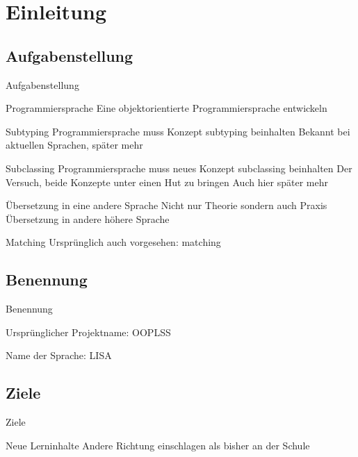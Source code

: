 \section{Einleitung}
\subsection{Aufgabenstellung}
\begin{frame}[t]{Aufgabenstellung}
	\begin{bigitemize}[<+->]{3mm}
		\item Programmiersprache
		 {Eine objektorientierte Programmiersprache entwickeln}

		\item Subtyping
		 {Programmiersprache muss Konzept subtyping beinhalten}
		 {Bekannt bei aktuellen Sprachen, später mehr}

		\item Subclassing
		 {Programmiersprache muss neues Konzept subclassing beinhalten}
		 {Der Versuch, beide Konzepte unter einen Hut zu bringen}
		 {Auch hier später mehr}

		\item Übersetzung in eine andere Sprache
		 {Nicht nur Theorie sondern auch Praxis}
		 {Übersetzung in andere höhere Sprache}

		\item Matching
		 {Ursprünglich auch vorgesehen: matching}

	\end{bigitemize}

\end{frame}

\subsection{Benennung}
\begin{frame}[t]{Benennung}
	\begin{bigitemize}[<+->]{3mm}

		\item Ursprünglicher Projektname: OOPLSS

		\item Name der Sprache: LISA 

	\end{bigitemize}


\end{frame}

\subsection{Ziele}
\begin{frame}[t]{Ziele}

	\begin{bigitemize}[<+->]{3mm}
		\item Neue Lerninhalte
		 {Andere Richtung einschlagen als bisher an der Schule}
	\end{bigitemize}

\end{frame}
